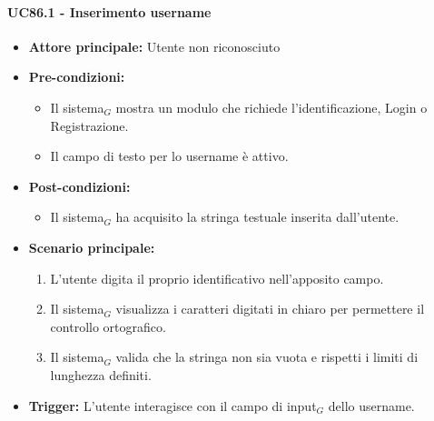\documentclass[a4paper, 10pt]{article}
\begin{document}
\paragraph{UC86.1 - Inserimento username}
\hypertarget{uc:86.1}{}
\begin{itemize}
    \item \textbf{Attore principale:} Utente non riconosciuto
    \item \textbf{Pre-condizioni:} 
        \begin{itemize}
            \item Il sistema$_G$ mostra un modulo che richiede l'identificazione, Login o Registrazione.
            \item Il campo di testo per lo username è attivo.   
        \end{itemize}
    \item \textbf{Post-condizioni:} 
        \begin{itemize}
            \item Il sistema$_G$ ha acquisito la stringa testuale inserita dall'utente.
        \end{itemize}
    \item \textbf{Scenario principale:}
        \begin{enumerate}
            \item L'utente digita il proprio identificativo nell'apposito campo.
            \item Il sistema$_G$ visualizza i caratteri digitati in chiaro per permettere il controllo ortografico.
            \item Il sistema$_G$ valida che la stringa non sia vuota e rispetti i limiti di lunghezza definiti.
        \end{enumerate}
    \item \textbf{Trigger:} L'utente interagisce con il campo di input$_G$ dello username.
\end{itemize}
\end{document}
